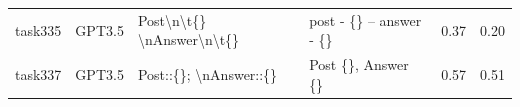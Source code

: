 \begin{longtable}{@{}p{0.8cm\tiny}p{1cm\tiny}p{4.1cm\ttfamily\tiny}p{4.1cm\ttfamily\tiny}p{0.8cm\tiny}p{0.8cm\tiny}@{}}
task335   & GPT3.5    & Post\textbackslash{}n\textbackslash{}t\{\} \textbackslash{}nAnswer\textbackslash{}n\textbackslash{}t\{\}                                                                                                                                                                                                                                                                                                                                                                                                                & post - \{\} -- answer - \{\}                                                                                                                                                                                                                                                                                                                                                                                                                                                                                                                                                      & 0.37 & 0.20 \\
task337   & GPT3.5    & Post::\{\}; \textbackslash{}nAnswer::\{\}                                                                                                                                                                                                                                                                                                                                                                                                                                                                               & Post \{\}, Answer \{\}                                                                                                                                                                                                                                                                                                                                                                                                                                                                                                                                                            & 0.57 & 0.51 \\

\end{longtable}
